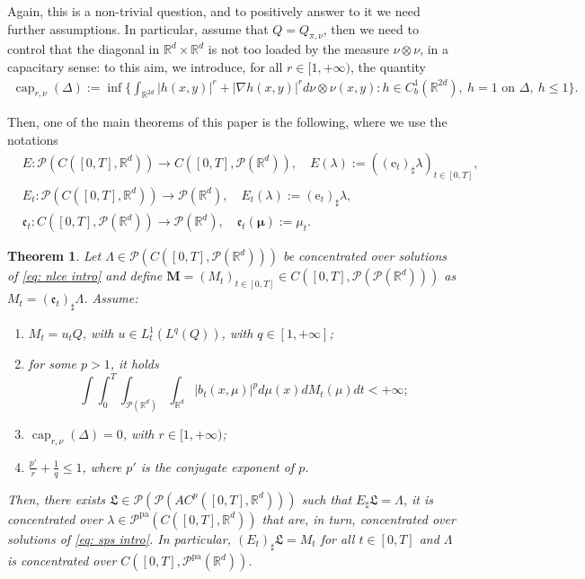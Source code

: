 \documentclass[10pt,leqno]{amsart}
\numberwithin{equation}{section}
\newtheorem{teorema}{Theorem}[section]
\newcommand{\R}{\mathbb{R}}
\newcommand{\Q}{\mathbb{Q}}
\newcommand{\PP}{\mathcal{P}}
\newcommand{\PPpa}{\PP^{\operatorname{pa}}}
\newcommand{\e}{\mathrm{e}}
\renewcommand{\Q}{Q}
\begin{document}
Again, this is a non-trivial question, and to positively answer to it we need further assumptions. In particular, assume that $Q = Q_{\pi,\nu}$, then we need to control that the diagonal in $\R^d\times \R^d$ is not too loaded by the measure $\nu\otimes \nu$, in a capacitary sense: to this aim, we introduce, for all $r\in[1,+\infty)$, the quantity 
\begin{equation*}
    \begin{aligned}
         \operatorname{cap}_{r,\nu}(\Delta) :=\inf \bigg\{ \int_{\R^{2d}} |h(x,y)|^r +  |\nabla h(x,y)|^r d\nu\otimes\nu(x,y) : 
         h\in C^{1}_b(\R^{2d}), \ h= 1 \text{ on }\Delta, \  h \leq 1 \bigg\}.
    \end{aligned}
\end{equation*}

Then, one of the main theorems of this paper is the following, where we use the notations
\begin{equation}\label{eq: maps for marginals}
    \begin{aligned}
        & E:\PP(C([0,T],\R^d)) \to C([0,T],\PP(\R^d)), \quad E(\lambda):= ((\e_t)_\sharp \lambda)_{t\in [0,T]},
        \\
        & E_t:\PP(C([0,T],\R^d)) \to \PP(\R^d), \quad E_t(\lambda) := (\e_t)_\sharp \lambda,
        \\
        & \mathfrak{e}_t: C([0,T],\PP(\R^d)) \to \PP(\R^d), \quad \mathfrak{e}_t(\boldsymbol{\mu}):= \mu_t.
    \end{aligned}
\end{equation}


\begin{teorema}\label{main theorem intro}
    Let $\Lambda \in \PP(C([0,T],\PP(\R^d)))$ be concentrated over solutions of \eqref{eq: nlce intro} and define $\boldsymbol{M} = (M_t)_{t\in[0,T]} \in C([0,T],\PP(\PP(\R^d)))$ as $M_t = (\mathfrak{e}_t)_\sharp \Lambda$. Assume:
    \begin{enumerate}
        \item $M_t = u_t \Q$, with $u \in L^1_t(L^q(\Q))$, with $q\in[1,+\infty]$;
        \item for some $p>1$, it holds
        \begin{equation}
            \int\int_0^T\int_{\PP(\R^d)} \int_{\R^d} |b_t(x,\mu)|^p d\mu(x) dM_t(\mu) dt<+\infty;
        \end{equation}
        \item $\operatorname{cap}_{r,\nu}(\Delta) = 0$, with $r\in [1,+\infty)$;
        \item $\frac{p'}{r}+\frac{1}{q}\leq1$, where $p'$ is the conjugate exponent of $p$.
    \end{enumerate}
    Then, there exists $\mathfrak{L}\in \PP(\PP(AC^p([0,T],\R^d)))$ such that $E_\sharp \mathfrak{L} = \Lambda$, it is concentrated over $\lambda \in \PPpa(C([0,T],\R^d))$ that are, in turn, concentrated over solutions of \eqref{eq: sps intro}.
    In particular, $(E_t)_\sharp \mathfrak{L} = M_t$ for all $t\in[0,T]$ and $\Lambda$ is concentrated over $C([0,T],\PP^{\operatorname{pa}}(\R^d))$.
\end{teorema}
\end{document}
